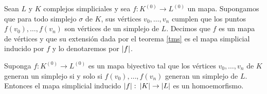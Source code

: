 \begin{Defi}
Sean $L$ y $K$ complejos simpliciales y sea $f\colon K^{(0)} \rightarrow L^{(0)}$ un mapa. Supongamos que  para todo simplejo $\sigma$ de $K$, sus vértices $v_0,\ldots,v_n$ cumplen que los puntos $f(v_0),\ldots,f(v_n)$ son vértices de un simplejo de $L$. Decimos que $f$ es un mapa de vértices y que su extensión dada por el teorema \ref{tms} es el mapa simplicial inducido por $f$ y lo denotaremos por $\left| f \right|$.
\end{Defi}
\begin{Teo}
Suponga $f:K^{(0)}\rightarrow L^{(0)}$ es un mapa biyectivo tal que los vértices $v_0,\ldots,v_n$ de $K$ generan un simplejo si y solo si $f(v_0),\ldots,f(v_n)$ generan un simplejo de $L$. Entonces el mapa simplicial inducido $\left| f \right|\colon \left| K \right|\rightarrow\left| L \right|$ es un homoemorfismo.
\end{Teo}
